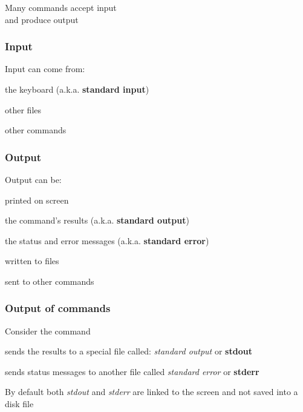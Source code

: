 \documentclass[12pt]{beamer}\usepackage[]{graphicx}\usepackage[]{color}
\begin{document}
\begin{frame}
\begin{center}
\Huge{}
\end{center}
\end{frame}


\begin{frame}
\frametitle{}

\begin{center}
\Large{Many commands accept {\hilit input} \\ 
and produce {\mdlit output}}
\end{center}

\end{frame}


\begin{frame}
\frametitle{Input}

Input can come from:
\bbi
  \item the keyboard (a.k.a. \textbf{standard input})
  \item other files
  \item other commands
\ei

\end{frame}


\begin{frame}
\frametitle{Output}

Output can be:
\bbi
  \item printed on screen 
  \bi
    \item the command's results (a.k.a. \textbf{standard output})
    \item the status and error messages (a.k.a. \textbf{standard error})
  \ei
  \item written to files
  \item sent to other commands
\ei

\end{frame}


\begin{frame}
\frametitle{Output of commands}

\bi
  \item Consider the command 
  \item {} sends the results to a special file called: \textit{standard output} or \textbf{stdout}
  \item {} sends status messages to another file called \textit{standard error} or \textbf{stderr}
  \item By default both \textit{stdout} and \textit{stderr} are linked to the screen and not saved into a disk file
\ei

\end{frame}
\end{document}
